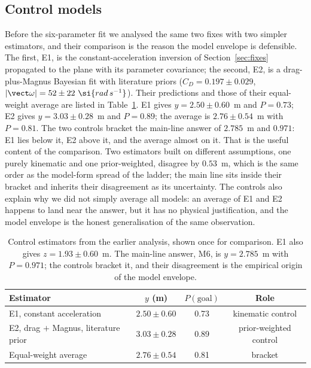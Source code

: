 \subsection{Control models}
\label{sec:controls}

Before the six-parameter fit we analysed the same two fixes with two simpler
estimators, and their comparison is the reason the model envelope is defensible.
The first, E1, is the constant-acceleration inversion of Section~\ref{sec:fixes}
propagated to the plane with its parameter covariance; the second, E2, is a
drag-plus-Magnus Bayesian fit with literature priors
($C_D=0.197\pm0.029$, $|\vect\omega|=52\pm22~\si{rad\,s^{-1}}$). Their predictions
and those of their equal-weight average are listed in Table~\ref{tab:controls}.
E1 gives $y=2.50\pm0.60$~m and $P=0.73$; E2 gives $y=3.03\pm0.28$~m and
$P=0.89$; the average is $2.76\pm0.54$~m with $P=0.81$. The two controls
bracket the main-line answer of $2.785$~m and $0.971$: E1 lies
below it, E2 above it, and the average almost on it. That is the useful content
of the comparison. Two estimators built on different assumptions, one purely
kinematic and one prior-weighted, disagree by $0.53$~m, which is the same order
as the model-form spread of the ladder; the main line sits inside their bracket
and inherits their disagreement as its uncertainty. The controls also explain why
we did not simply average all models: an average of E1 and E2 happens to land
near the answer, but it has no physical justification, and the model envelope is
the honest generalisation of the same observation.

\begin{table}[t]
  \centering
  \caption{Control estimators from the earlier analysis, shown once for
  comparison. E1 also gives $z=1.93\pm0.60$~m. The main-line answer, M6, is
  $y=2.785$~m with $P=0.971$; the controls bracket it, and their disagreement is
  the empirical origin of the model envelope.}
  \label{tab:controls}
  \small
  \begin{tabular}{@{}lccc@{}}
    \toprule
    Estimator & $y$ (m) & $P(\text{goal})$ & Role \\
    \midrule
    E1, constant acceleration & $2.50\pm0.60$ & 0.73 & kinematic control \\
    E2, drag $+$ Magnus, literature prior & $3.03\pm0.28$ & 0.89 & prior-weighted control \\
    Equal-weight average & $2.76\pm0.54$ & 0.81 & bracket \\
    \bottomrule
  \end{tabular}
\end{table}

